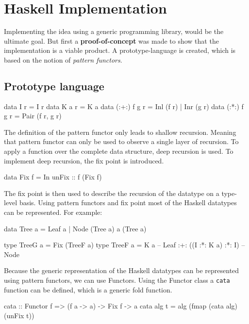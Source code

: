 \section{Haskell Implementation}

Implementing the idea using a generic programming library, would be the ultimate goal. But first a \textbf{proof-of-concept} was made to show that the implementation is a viable product. A prototype-language is created, which is based on the notion of \textit{pattern functors}.

\subsection{Prototype language}
\begin{haskell}
data I r         = I r                  
data K a r       = K a                  
data (:+:) f g r = Inl (f r) | Inr (g r)
data (:*:) f g r = Pair (f r, g r)
\end{haskell}

The definition of the pattern functor only leads to shallow recursion. Meaning that pattern functor can only be used to observe a single layer of recursion. To apply a function over the complete data structure, deep recursion is used. To implement deep recursion, the fix point is introduced.

\begin{haskell}
data Fix f = In { unFix :: f (Fix f) }
\end{haskell}

The fix point is then used to describe the recursion of the datatype on a type-level basis. Using pattern functors and fix point most of the Haskell datatypes can be represented. For example:

\begin{haskell}
data Tree a = Leaf a
            | Node (Tree a) a (Tree a)

type TreeG a = Fix (TreeF a)
type TreeF a = K a                  -- Leaf
            :+: ((I :*: K a) :*: I) -- Node
\end{haskell}

Because the generic representation of the Haskell datatypes can be represented using pattern functors, we can use Functors. Using the Functor class a \texttt{cata} function can be defined, which is a generic fold function.

\begin{haskell}
cata :: Functor f => (f a -> a) -> Fix f -> a
cata alg t = alg (fmap (cata alg) (unFix t))
\end{haskell}

